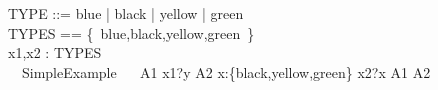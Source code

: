 \begin{circus}%
TYPE ::= blue | black | yellow | green\\
TYPES == \{~blue,black,yellow,green~\}\\
\circchannel x1,x2 : TYPES\\
 \circprocess\ ~SimpleExample ~\circdef~\circbegin
  A1 \circdef x1?y \then \Skip
  A2 \circdef \Extchoice x:\{black,yellow,green\} \circspot x2?x \then \Skip
  \circspot  A1 \intchoice A2
  \circend
\end{circus}